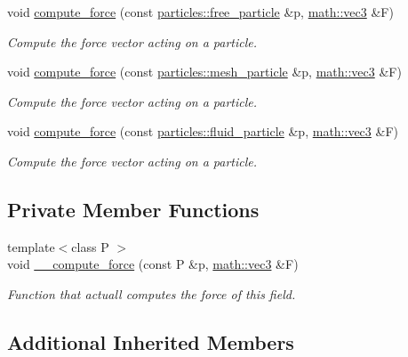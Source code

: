 \begin{DoxyCompactItemize}
void \hyperlink{classphysim_1_1fields_1_1magnetic__B_a806a3e8aa306f0ed33954d79c3082698}{compute\+\_\+force} (const \hyperlink{classphysim_1_1particles_1_1free__particle}{particles\+::free\+\_\+particle} \&p, \hyperlink{structphysim_1_1math_1_1vec3}{math\+::vec3} \&F)
\begin{DoxyCompactList}\small\item\em Compute the force vector acting on a particle. \end{DoxyCompactList}\item 
void \hyperlink{classphysim_1_1fields_1_1magnetic__B_aa337b83c6dea0726d2dc2d7cd1cd978a}{compute\+\_\+force} (const \hyperlink{classphysim_1_1particles_1_1mesh__particle}{particles\+::mesh\+\_\+particle} \&p, \hyperlink{structphysim_1_1math_1_1vec3}{math\+::vec3} \&F)
\begin{DoxyCompactList}\small\item\em Compute the force vector acting on a particle. \end{DoxyCompactList}\item 
void \hyperlink{classphysim_1_1fields_1_1magnetic__B_a17ca2b3c6cbf61c53665cf23632187b8}{compute\+\_\+force} (const \hyperlink{classphysim_1_1particles_1_1fluid__particle}{particles\+::fluid\+\_\+particle} \&p, \hyperlink{structphysim_1_1math_1_1vec3}{math\+::vec3} \&F)
\begin{DoxyCompactList}\small\item\em Compute the force vector acting on a particle. \end{DoxyCompactList}\end{DoxyCompactItemize}
\subsection*{Private Member Functions}
\begin{DoxyCompactItemize}
\item 
{\footnotesize template$<$class P $>$ }\\void \hyperlink{classphysim_1_1fields_1_1magnetic__B_ad7c54b149a9a43b086dfab580129bfb2}{\+\_\+\+\_\+compute\+\_\+force} (const P \&p, \hyperlink{structphysim_1_1math_1_1vec3}{math\+::vec3} \&F)
\begin{DoxyCompactList}\small\item\em Function that actuall computes the force of this field. \end{DoxyCompactList}\end{DoxyCompactItemize}
\subsection*{Additional Inherited Members}


